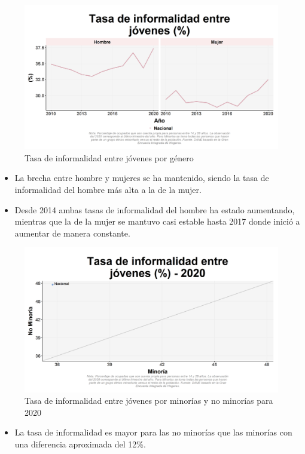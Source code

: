     \begin{figure}[H]
        \caption{Tasa de informalidad entre jóvenes por género \label{map_result_2} }
        \begin{center}
        \includegraphics[width=\textwidth,keepaspectratio]{img/var_75_trend.png}
        \end{center}
    \end{figure}
            \begin{itemize}
                \item La brecha entre hombre y mujeres se ha mantenido, siendo la tasa de informalidad del hombre más alta a la de la mujer.
                \item Desde 2014 ambas tasas de informalidad del hombre ha estado aumentando, mientras que la de la mujer se mantuvo casi estable hasta 2017 donde inició a aumentar de manera constante.
                \end{itemize}

    \begin{figure}[H]
        \caption{Tasa de informalidad entre jóvenes por minorías y no minorías para 2020 \label{map_result_2} }
        \begin{center}
        \includegraphics[width=\textwidth,keepaspectratio]{img/var_74_scatter.png}
        \end{center}
    \end{figure}
            \begin{itemize}
                \item La tasa de informalidad es mayor para las no minorías que las minorías con una diferencia aproximada del 12\%.
                \end{itemize}

